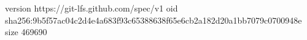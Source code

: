 version https://git-lfs.github.com/spec/v1
oid sha256:9b5f57ac04c2d4e4a683f93c65388638f65e6cb2a182d20a1bb7079c0700948e
size 469690
